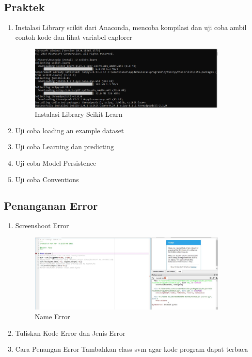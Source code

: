 \subsection{Praktek}
\begin{enumerate}
	\item Instalasi Library scikit dari Anaconda, mencoba kompilasi dan uji coba ambil contoh kode dan lihat variabel explorer
	\hfill\break
	\begin{figure}[h]
		\includegraphics[width=10cm]{figures/1184013/chapter 1/01.JPG}
		\centering
		\caption{Instalasi Library Scikit Learn}
	\end{figure}
	\newpage\item Uji coba loading an example dataset
	\hfill\break

\item Uji coba Learning dan predicting
	\hfill\break
	
\item Uji coba Model Persistence
	\hfill\break
	
	\item Uji coba Conventions
	\hfill\break
	
	\end{enumerate}
	\subsection{Penanganan Error}
\begin{enumerate}
	\item Screenshoot Error
	\begin{figure}[h]
		\includegraphics[width=10cm]{figures/1184013/chapter 1/eror.JPG}
		\centering
		\caption{Name Error}
	\end{figure}
	\newpage\item Tuliskan Kode Error dan Jenis Error
	\hfill\break
	
\hfill\break
	\item Cara Penangan Error
\hfill\break Tambahkan class svm agar kode program dapat terbaca
	\end{enumerate}
